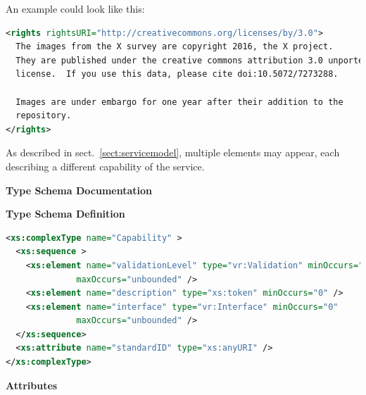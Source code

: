 \documentclass[11pt,a4paper]{ivoa}
\begin{document}
An example could look like this:

\begin{lstlisting}[language=XML]
<rights rightsURI="http://creativecommons.org/licenses/by/3.0">
  The images from the X survey are copyright 2016, the X project.
  They are published under the creative commons attribution 3.0 unported
  license.  If you use this data, please cite doi:10.5072/7273288.

  Images are under embargo for one year after their addition to the
  repository.
</rights>
\end{lstlisting}

As described in sect.~\ref{sect:servicemodel}, multiple
 elements may appear, each describing a
different capability of the service.  


\begingroup
      	\renewcommand*\descriptionlabel[1]{%
      	\hbox to 5.5em{\emph{#1}\hfil}}\vspace{2ex}\noindent\textbf{ Type Schema Documentation}


\vspace{1ex}\noindent\textbf{ Type Schema Definition}

\begin{lstlisting}[language=XML,basicstyle=\footnotesize]
<xs:complexType name="Capability" >
  <xs:sequence >
    <xs:element name="validationLevel" type="vr:Validation" minOccurs="0"
              maxOccurs="unbounded" />
    <xs:element name="description" type="xs:token" minOccurs="0" />
    <xs:element name="interface" type="vr:Interface" minOccurs="0"
              maxOccurs="unbounded" />
  </xs:sequence>
  <xs:attribute name="standardID" type="xs:anyURI" />
</xs:complexType>
\end{lstlisting}

\vspace{0.5ex}\noindent\textbf{ Attributes}
\end{document}

